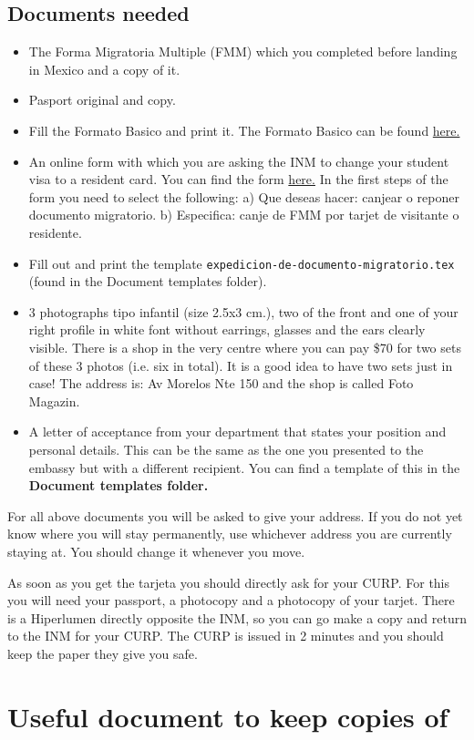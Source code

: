 \documentclass{article}
\begin{document}
\subsection{Documents needed}

\begin{itemize}
\item The Forma Migratoria Multiple (FMM) which you completed before landing in Mexico and a copy of it. 
\item Pasport original and copy. 
\item Fill the Formato Basico and print it. The Formato Basico can be found \href{http://www.inm.gob.mx/complementos/FORMATO/Formato_Basico.pdf}{here.}
\item An online form with which you are asking the INM to change your student visa to a resident card. You can find the form \href{https://www.inm.gob.mx/tramites/publico/estancia.html}{here.} In the first steps of the form you need to select the following: 
 a) Que deseas hacer: canjear o reponer documento migratorio. b) Especifica: canje de FMM por tarjet de visitante o residente.  
\item Fill out and print the template \texttt{expedicion-de-documento-migratorio.tex} (found in the Document templates folder).
\item 3 photographs tipo infantil (size 2.5x3 cm.), two of the front and one of your right profile in white font without earrings, glasses and the ears clearly visible. There is a shop in the very centre where you can pay \$70 for two sets of these 3 photos (i.e. six in total). It is a good idea to have two sets just in case! The address is: Av Morelos Nte 150 and the shop is called Foto Magazin.
\item A letter of acceptance from your department that states your position and personal details. This can be the same as the one you presented to the embassy but with a different recipient. You can find a template of this in the \textbf{Document templates folder.}
\end{itemize}

For all above documents you will be asked to give your address. If you do not yet know where you will stay permanently, use whichever address you are currently staying at.  You should change it whenever you move.

As soon as you get the tarjeta you should directly ask for your CURP. For this you will need your passport, a photocopy and a photocopy of your tarjet. There is a Hiperlumen directly opposite the INM, so you can go make a copy and return to the INM for your CURP. The CURP is issued in 2 minutes and you should keep the paper they give you safe. 

\section{Useful document to keep copies of}
\end{document}
